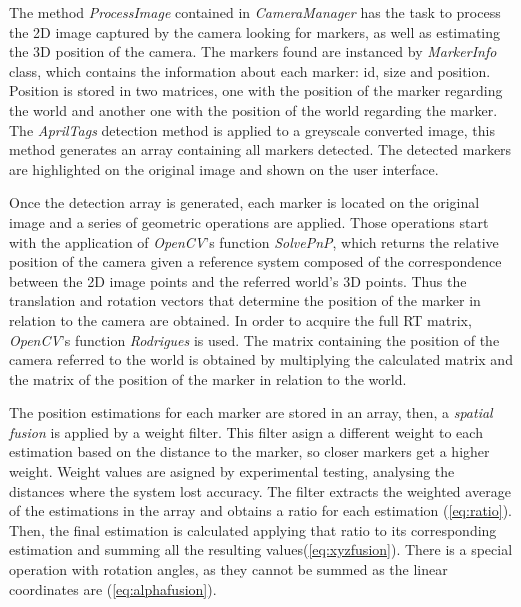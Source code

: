 \documentclass{styles/svproc}
\begin{document}
	
	
	The method \textit{ProcessImage} contained in \textit{CameraManager} has the task to process the 2D image captured by the camera looking for markers, as well as estimating the 3D position of the camera. The markers found are instanced by \textit{MarkerInfo} class, which contains the information about each marker: id, size and position. Position is stored in two matrices, one with the position of the marker regarding the world and another one with the position of the world regarding the marker. The \textit{AprilTags} detection method is applied to a greyscale converted image, this method generates an array containing all markers detected. The detected markers are highlighted on the original image and shown on the user interface.
	
	Once the detection array is generated, each marker is located on the original image and a series of geometric operations are applied. Those operations start with the application of \textit{OpenCV}'s function \textit{SolvePnP}, which returns the relative position of the camera given a reference system composed of the correspondence between the 2D image points and the referred world's 3D points. Thus the translation and rotation vectors that determine the position of the marker in relation to the camera are obtained. In order to acquire the full RT matrix, \textit{OpenCV}'s function \textit{Rodrigues} is used. The matrix containing the position of the camera referred to the world is obtained by multiplying the calculated matrix and the matrix of the position of the marker in relation to the world.
	
	The position estimations for each marker are stored in an array, then, a \textit{spatial fusion} is applied by a weight filter. This filter asign a different weight to each estimation based on the distance to the marker, so closer markers get a higher weight. Weight values are asigned by experimental testing, analysing the distances where the system lost accuracy. The filter extracts the weighted average of the estimations in the array and obtains a ratio for each estimation (\ref{eq:ratio}). Then, the final estimation is calculated applying that ratio to its corresponding estimation and summing all the resulting values(\ref{eq:xyzfusion}). There is a special operation with rotation angles, as they cannot be summed as the linear coordinates are (\ref{eq:alphafusion}).
	
\end{document}
